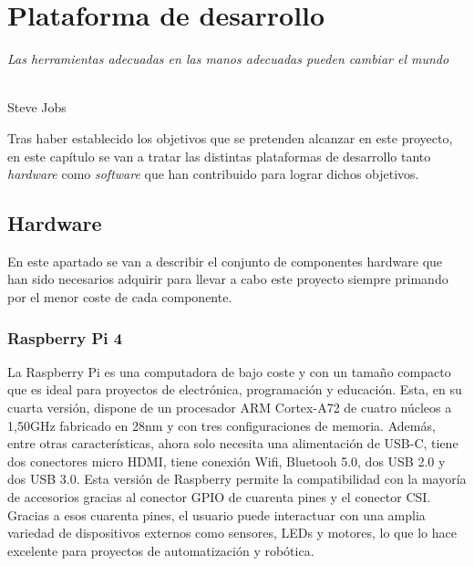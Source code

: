 \chapter{Plataforma de desarrollo}
\label{cap:capitulo3}

\begin{flushright}
\begin{minipage}[]{10cm}
\emph{Las herramientas adecuadas en las manos adecuadas pueden cambiar el mundo}\\
\end{minipage}\\

Steve Jobs\\
\end{flushright}

\vspace{1cm}

Tras haber establecido los objetivos que se pretenden alcanzar en este proyecto, en este capítulo se van a tratar las distintas plataformas de desarrollo tanto \textit{hardware} como \textit{software} que han contribuido para lograr dichos objetivos.

\section{Hardware}

En este apartado se van a describir el conjunto de componentes hardware que han sido necesarios adquirir para llevar a cabo este proyecto siempre primando por el menor coste de cada componente.

\subsection{Raspberry Pi 4}

La Raspberry Pi es una computadora de bajo coste y con un tamaño compacto que es ideal para proyectos de electrónica, programación y educación. Esta, en su cuarta versión, dispone de un procesador ARM Cortex-A72 de cuatro núcleos a 1,50GHz fabricado en 28nm y con tres configuraciones de memoria. Además, entre otras características, ahora solo necesita una alimentación de USB-C, tiene dos conectores micro HDMI, tiene conexión Wifi, Bluetooh 5.0, dos USB 2.0 y dos USB 3.0. Esta versión de Raspberry permite la compatibilidad con la mayoría de accesorios gracias al conector GPIO de cuarenta pines y el conector \ac{CSI}. Gracias a esos cuarenta pines, el usuario puede interactuar con una amplia variedad de dispositivos externos como sensores, LEDs y motores, lo que lo hace excelente para proyectos de automatización y robótica. 

